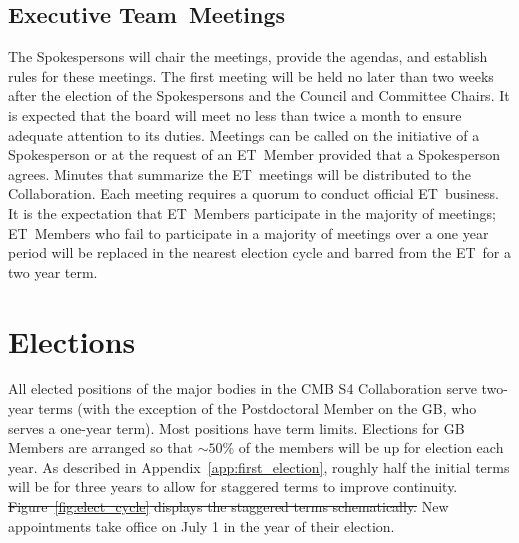 \documentclass[12pt]{article}
\newcommand{\exec}{{Executive Team}}
\newcommand{\shorte}{{ET}}  %
\begin{document}


\subsection{\exec \ Meetings}

The Spokespersons will chair the meetings, provide the agendas, and establish rules for these meetings. The first meeting will be held no later than two weeks after the election of the Spokespersons and the Council and Committee Chairs. It is expected that the board will meet no less than twice a month to ensure adequate attention to its duties. Meetings can be called on the initiative of a Spokesperson or at the request of an \shorte\ Member provided that a Spokesperson agrees. Minutes that summarize the \shorte\ meetings will be distributed to the Collaboration. Each meeting requires a quorum to conduct official \shorte\ business.  It is the expectation that \shorte\ Members participate in the majority of meetings; \shorte\ Members who fail to participate %
in a majority of meetings over a one year period will be replaced in the nearest election cycle and barred from the \shorte\ for a two year term.  


\section{Elections}\label{sec:elections}
All elected positions of the major bodies in the CMB S4 Collaboration serve two-year terms (with the exception of the Postdoctoral Member on the GB, who serves a one-year term). Most positions have term limits.  Elections for %
GB Members are  arranged so that $\sim 50\%$ of the members will be up for election each year.  As described in Appendix~\ref{app:first_election}, roughly half the initial terms will be for three years to allow for staggered terms to improve continuity.  {\color{red} \sout{Figure~\ref{fig:elect_cycle} displays the staggered terms schematically.}}  New appointments take office on July 1 in the year of their election.  

\end{document}
